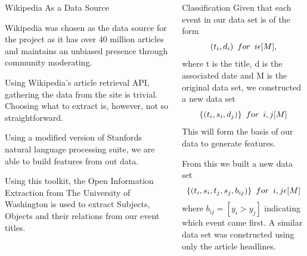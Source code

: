 \documentclass[final]{beamer}
\newlength{\onecolwid}
\newlength{\twocolwid}
\begin{document}
\begin{frame}[t]
\begin{columns}[t]
\begin{column}{\twocolwid}
\begin{columns}[t,totalwidth=\twocolwid]
\begin{column}{\onecolwid}
  \begin{block}{Wikipedia As a Data Source}

    Wikipedia was chosen as the data source for the project as it has over 40 million
    articles \cite{} and maintains an unbiased presence through community moderating.
    
Using Wikipedia's article retrieval API, gathering the data from
the site is trivial. Choosing what to extract is, however, not
so straightforward.

Using a modified version of Stanfords natural language processing suite,
we are able to build features from out data.

Using this toolkit, the Open Information Extraction from
The University of Washington is used to extract Subjects, Objects
and their relations from our event titles.

\end{block}


\end{column} %

\begin{column}{\onecolwid}\vspace{-.6in} %


\begin{block}{Classification}
  Given that each event in our data set is of the form
  \begin{equation}
  (t_{i},d_{i}) \hspace{0.5em}for\hspace{0.5em} i \epsilon [M],
    \end{equation}
    where t is the title, d is the associated date and M is the original data set,
    we constructed a new data set
    \begin{equation}
      \{(t_{i},s_{i},d_{j})\} \hspace{0.5em} for \hspace{0.5em}i,j [M]
    \end{equation}
    This will form the basis of our data to generate features.

    From this we built a new data set
    \begin{equation}
      \{(t_{i},s_{i},t_{j},s_{j},b_{ij})\} \hspace{0.5em} for \hspace{0.5em} i,j \epsilon [M]
      \end{equation}
where $b_{ij} = [y_{i} > y_{j}]$ indicating which event came first.
A similar data set was constructed using only the article headlines.


\end{block}
\end{column}
\end{columns}
\end{column}
\end{columns}
\end{frame}
\end{document}
